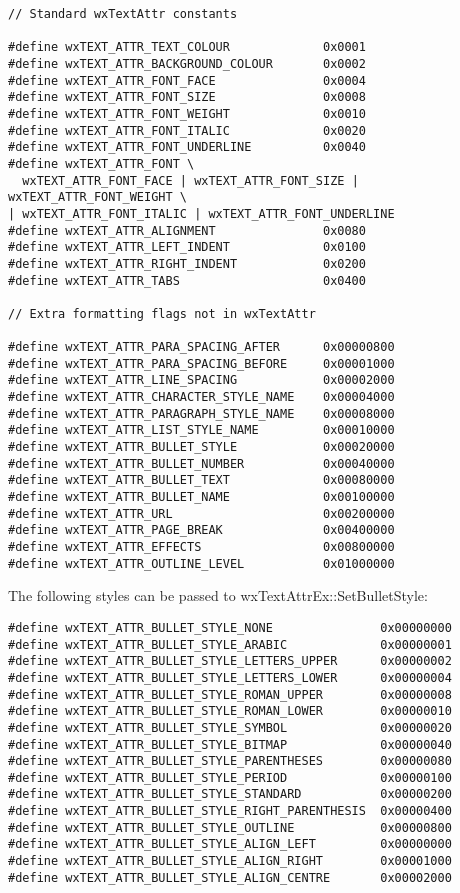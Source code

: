 {\small
\begin{verbatim}
// Standard wxTextAttr constants

#define wxTEXT_ATTR_TEXT_COLOUR             0x0001
#define wxTEXT_ATTR_BACKGROUND_COLOUR       0x0002
#define wxTEXT_ATTR_FONT_FACE               0x0004
#define wxTEXT_ATTR_FONT_SIZE               0x0008
#define wxTEXT_ATTR_FONT_WEIGHT             0x0010
#define wxTEXT_ATTR_FONT_ITALIC             0x0020
#define wxTEXT_ATTR_FONT_UNDERLINE          0x0040
#define wxTEXT_ATTR_FONT \
  wxTEXT_ATTR_FONT_FACE | wxTEXT_ATTR_FONT_SIZE | wxTEXT_ATTR_FONT_WEIGHT \
| wxTEXT_ATTR_FONT_ITALIC | wxTEXT_ATTR_FONT_UNDERLINE
#define wxTEXT_ATTR_ALIGNMENT               0x0080
#define wxTEXT_ATTR_LEFT_INDENT             0x0100
#define wxTEXT_ATTR_RIGHT_INDENT            0x0200
#define wxTEXT_ATTR_TABS                    0x0400

// Extra formatting flags not in wxTextAttr

#define wxTEXT_ATTR_PARA_SPACING_AFTER      0x00000800
#define wxTEXT_ATTR_PARA_SPACING_BEFORE     0x00001000
#define wxTEXT_ATTR_LINE_SPACING            0x00002000
#define wxTEXT_ATTR_CHARACTER_STYLE_NAME    0x00004000
#define wxTEXT_ATTR_PARAGRAPH_STYLE_NAME    0x00008000
#define wxTEXT_ATTR_LIST_STYLE_NAME         0x00010000
#define wxTEXT_ATTR_BULLET_STYLE            0x00020000
#define wxTEXT_ATTR_BULLET_NUMBER           0x00040000
#define wxTEXT_ATTR_BULLET_TEXT             0x00080000
#define wxTEXT_ATTR_BULLET_NAME             0x00100000
#define wxTEXT_ATTR_URL                     0x00200000
#define wxTEXT_ATTR_PAGE_BREAK              0x00400000
#define wxTEXT_ATTR_EFFECTS                 0x00800000
#define wxTEXT_ATTR_OUTLINE_LEVEL           0x01000000
\end{verbatim}
}

The following styles can be passed to wxTextAttrEx::SetBulletStyle:

{\small
\begin{verbatim}
#define wxTEXT_ATTR_BULLET_STYLE_NONE               0x00000000
#define wxTEXT_ATTR_BULLET_STYLE_ARABIC             0x00000001
#define wxTEXT_ATTR_BULLET_STYLE_LETTERS_UPPER      0x00000002
#define wxTEXT_ATTR_BULLET_STYLE_LETTERS_LOWER      0x00000004
#define wxTEXT_ATTR_BULLET_STYLE_ROMAN_UPPER        0x00000008
#define wxTEXT_ATTR_BULLET_STYLE_ROMAN_LOWER        0x00000010
#define wxTEXT_ATTR_BULLET_STYLE_SYMBOL             0x00000020
#define wxTEXT_ATTR_BULLET_STYLE_BITMAP             0x00000040
#define wxTEXT_ATTR_BULLET_STYLE_PARENTHESES        0x00000080
#define wxTEXT_ATTR_BULLET_STYLE_PERIOD             0x00000100
#define wxTEXT_ATTR_BULLET_STYLE_STANDARD           0x00000200
#define wxTEXT_ATTR_BULLET_STYLE_RIGHT_PARENTHESIS  0x00000400
#define wxTEXT_ATTR_BULLET_STYLE_OUTLINE            0x00000800
#define wxTEXT_ATTR_BULLET_STYLE_ALIGN_LEFT         0x00000000
#define wxTEXT_ATTR_BULLET_STYLE_ALIGN_RIGHT        0x00001000
#define wxTEXT_ATTR_BULLET_STYLE_ALIGN_CENTRE       0x00002000
\end{verbatim}
}

